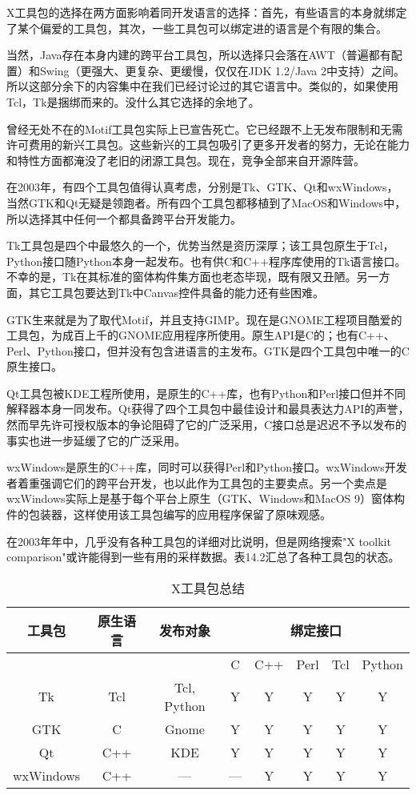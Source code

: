 \documentclass[12pt,oneside]{ctexbook}
\begin{document}
\begin{common-format}
X工具包的选择在两方面影响着同开发语言的选择：首先，有些语言的本身就绑定了某个偏爱的工具包，其次，一些工具包可以绑定进的语言是个有限的集合。

当然，Java存在本身内建的跨平台工具包，所以选择只会落在AWT（普遍都有配置）和Swing（更强大、更复杂、更缓慢，仅仅在JDK 1.2/Java 2中支持）之间。所以这部分余下的内容集中在我们已经讨论过的其它语言中。类似的，如果使用Tcl，Tk是捆绑而来的。没什么其它选择的余地了。

曾经无处不在的Motif工具包实际上已宣告死亡。它已经跟不上无发布限制和无需许可费用的新兴工具包。这些新兴的工具包吸引了更多开发者的努力，无论在能力和特性方面都淹没了老旧的闭源工具包。现在，竞争全部来自开源阵营。

在2003年，有四个工具包值得认真考虑，分别是Tk、GTK、Qt和wxWindows，  当然GTK和Qt无疑是领跑者。所有四个工具包都移植到了MacOS和Windows中，所以选择其中任何一个都具备跨平台开发能力。

Tk工具包是四个中最悠久的一个，优势当然是资历深厚；该工具包原生于Tcl，Python接口随Python本身一起发布。也有供C和C++程序库使用的Tk语言接口。不幸的是，Tk在其标准的窗体构件集方面也老态毕现，既有限又丑陋。另一方面，其它工具包要达到Tk中Canvas控件具备的能力还有些困难。

GTK生来就是为了取代Motif，并且支持GIMP。现在是GNOME工程项目酷爱的工具包，为成百上千的GNOME应用程序所使用。原生API是C的；也有C++、Perl、Python接口，但并没有包含进语言的主发布。GTK是四个工具包中唯一的C原生接口。

Qt工具包被KDE工程所使用，是原生的C++库，也有Python和Perl接口但并不同解释器本身一同发布。Qt获得了四个工具包中最佳设计和最具表达力API的声誉，然而早先许可授权版本的争论阻碍了它的广泛采用，C接口总是迟迟不予以发布的事实也进一步延缓了它的广泛采用。

wxWindows是原生的C++库，同时可以获得Perl和Python接口。wxWindows开发者着重强调它们的跨平台开发，也以此作为工具包的主要卖点。另一个卖点是wxWindows实际上是基于每个平台上原生（GTK、Windows和MacOS 9）窗体构件的包装器，这样使用该工具包编写的应用程序保留了原味观感。

在2003年年中，几乎没有各种工具包的详细对比说明，但是网络搜索"X toolkit comparison"或许能得到一些有用的采样数据。表14.2汇总了各种工具包的状态。

\begin{table}[H]
\centering
\caption{X工具包总结}
\label{tab:X工具包总结}
\medskip
\begin{tabular}{@{}cccccccc@{}}
\toprule
工具包 & 原生语言 & 发布对象  & \multicolumn{5}{c}{绑定接口}  \\ \midrule
           &               &                &  C & C++ & Perl  & Tcl & Python \\
Tk & Tcl & Tcl, Python & Y & Y & Y & Y & Y \\
GTK & C & Gnome & Y & Y & Y & Y & Y\\
Qt & C++ & KDE & Y & Y & Y & Y & Y\\
wxWindows & C++ & — & — & Y & Y & Y &  Y
 \\ \bottomrule
\end{tabular}
\end{table}



\end{common-format}
\end{document}
